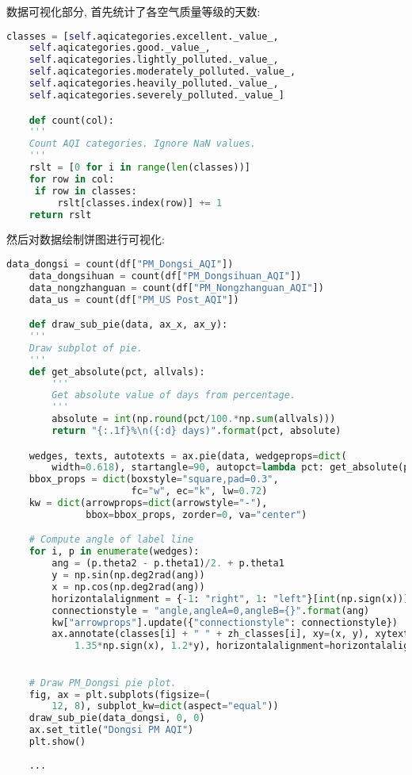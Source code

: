 数据可视化部分, 首先统计了各空气质量等级的天数:
\begin{lstlisting}[language=Python]
    classes = [self.aqicategories.excellent._value_,
    self.aqicategories.good._value_,
    self.aqicategories.lightly_polluted._value_,
    self.aqicategories.moderately_polluted._value_,
    self.aqicategories.heavily_polluted._value_,
    self.aqicategories.severely_polluted._value_]

    def count(col):
    '''
    Count AQI categories. Ignore NaN values.
    '''
    rslt = [0 for i in range(len(classes))]
    for row in col:
     if row in classes:
         rslt[classes.index(row)] += 1
    return rslt
\end{lstlisting}

然后对数据绘制饼图进行可视化:
\begin{lstlisting}[language=Python]
    data_dongsi = count(df["PM_Dongsi_AQI"])
    data_dongsihuan = count(df["PM_Dongsihuan_AQI"])
    data_nongzhanguan = count(df["PM_Nongzhanguan_AQI"])
    data_us = count(df["PM_US Post_AQI"])

    def draw_sub_pie(data, ax_x, ax_y):
    '''
    Draw subplot of pie.
    '''
    def get_absolute(pct, allvals):
        '''
        Get absolute value of days from percentage.
        '''
        absolute = int(np.round(pct/100.*np.sum(allvals)))
        return "{:.1f}%\n({:d} days)".format(pct, absolute)

    wedges, texts, autotexts = ax.pie(data, wedgeprops=dict(
        width=0.618), startangle=90, autopct=lambda pct: get_absolute(pct, data))
    bbox_props = dict(boxstyle="square,pad=0.3",
                      fc="w", ec="k", lw=0.72)
    kw = dict(arrowprops=dict(arrowstyle="-"),
              bbox=bbox_props, zorder=0, va="center")

    # Compute angle of label line
    for i, p in enumerate(wedges):
        ang = (p.theta2 - p.theta1)/2. + p.theta1
        y = np.sin(np.deg2rad(ang))
        x = np.cos(np.deg2rad(ang))
        horizontalalignment = {-1: "right", 1: "left"}[int(np.sign(x))]
        connectionstyle = "angle,angleA=0,angleB={}".format(ang)
        kw["arrowprops"].update({"connectionstyle": connectionstyle})
        ax.annotate(classes[i] + " " + zh_classes[i], xy=(x, y), xytext=(
            1.35*np.sign(x), 1.2*y), horizontalalignment=horizontalalignment, **kw)

    
    # Draw PM_Dongsi pie plot.
    fig, ax = plt.subplots(figsize=(
        12, 8), subplot_kw=dict(aspect="equal"))
    draw_sub_pie(data_dongsi, 0, 0)
    ax.set_title("Dongsi PM AQI")
    plt.show()
    
    ...
\end{lstlisting}

